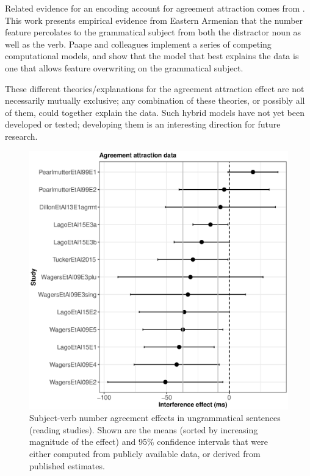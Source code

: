 \documentclass{cambridge7A}\usepackage[]{graphicx}\usepackage[]{color}
\makeatletter
\def\maxwidth{ %
  \ifdim\Gin@nat@width>\linewidth
    \linewidth
  \else
    \Gin@nat@width
  \fi
}
\newenvironment{knitrout}{}{} %
\makeatother
\begin{document}
Related evidence for an encoding account for agreement attraction comes from \cite{PaapeEtAlMPT2020}. This work presents empirical evidence from Eastern Armenian that  the number feature percolates to the grammatical subject from both the distractor noun as well as the verb.   Paape and colleagues implement a series of competing computational models, and show that the model that best explains the data is one that allows feature overwriting on the grammatical subject.

 These different theories/explanations for the agreement attraction effect are not necessarily mutually exclusive; any combination of these theories, or possibly all of them, could together explain the data. Such hybrid models have not yet been developed or tested; developing them is an interesting direction for future research.
  


\begin{figure}[!htbp]
\centering
\begin{knitrout}
\color{fgcolor}

{\centering \includegraphics[width=\maxwidth]{figures/fig-mismatchplot-1} 

}



\end{knitrout}
\caption{Subject-verb number agreement effects in ungrammatical sentences (reading studies). Shown are the means (sorted by increasing magnitude of the effect) and 95\% confidence intervals that were either computed from publicly available data, or derived from published estimates.}\label{fig:agrmtattrnc01}
\end{figure} 
\end{document}
